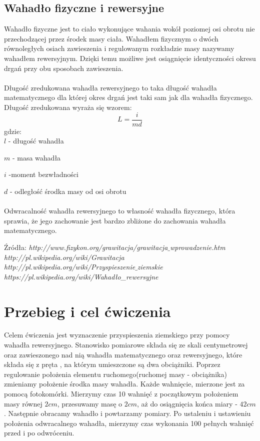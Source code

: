 \documentclass{article}
\begin{document}
\subsection{Wahadło fizyczne i rewersyjne }
Wahadło fizyczne jest to ciało wykonujące wahania wokół poziomej osi obrotu nie przechodzącej przez środek masy ciała. Wahadłem fizycznym o dwóch równoległych osiach zawieszenia i regulowanym rozkładzie masy nazywamy wahadłem rewersyjnym. Dzięki temu możliwe jest osiągnięcie identyczności okresu drgań przy obu sposobach zawieszenia.\\\\
Długość zredukowana wahadła rewersyjnego to taka długość wahadła matematycznego dla której okres drgań jest taki sam jak dla wahadła fizycznego. Długość zredukowana wyraża się wzorem:
$$L=\frac{i}{md}$$
gdzie:\\

$l$ - długość wahadła

$m$ - masa wahadła

$i$ -moment bezwładności

$d$ - odległość środka masy od osi obrotu\\\\
Odwracalność wahadła rewersyjnego to własność wahadła fizycznego, która sprawia, że jego zachowanie jest bardzo zbliżone do zachowania wahadła matematycznego.
\begin{flushright}
\begin{scriptsize}
Źródła: \textit{http://www.fizykon.org/grawitacja/grawitacja$\_$wprowadzenie.htm} \\
\textit{http://pl.wikipedia.org/wiki/Grawitacja}\\
\textit{http://pl.wikipedia.org/wiki/Przyspieszenie$\_$ziemskie}\\
\textit{https://pl.wikipedia.org/wiki/Wahadło\_rewersyjne}\\
\end{scriptsize}
\end{flushright}
\section{Przebieg i cel ćwiczenia}
Celem ćwiczenia jest wyznaczenie przyspieszenia ziemskiego przy pomocy wahadła rewersyjnego. Stanowisko pomiarowe składa się ze skali centymetrowej oraz zawieszonego nad nią wahadła matematycznego oraz rewersyjnego, które składa się z pręta , na którym umieszczone są dwa obciążniki. Poprzez regulowanie położenia elementu ruchomego(ruchomej masy - obciążnika) zmieniamy położenie środka masy wahadła. Każde wahnięcie, mierzone jest za pomocą fotokomórki. Mierzymy czas 10 wahnięć z początkowym położeniem masy równej $2cm$, przesuwamy masę o $2cm$, aż do osiągnięcia końca miary - $42cm$. Następnie obracamy wahadło i powtarzamy pomiary. Po ustaleniu i ustawieniu położenia odwracalnego wahadła, mierzymy czas wykonania 100 pełnych wahnięć przed i po odwróceniu.
\end{document}
